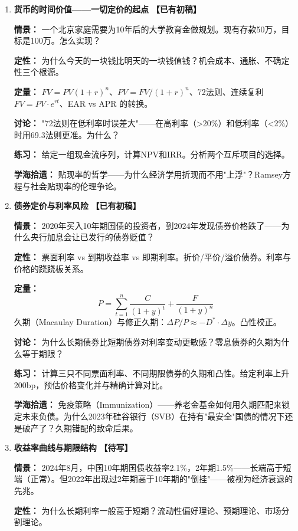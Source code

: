 \documentclass[a4paper,11pt]{ctexart}
\newcommand{\done}{\textcolor{green!50!black}{\textbf{【已有初稿】}}}
\newcommand{\draft}{\textcolor{orange!80!black}{\textbf{【待写】}}}
\begin{document}
\begin{enumerate}

\item[\textbf{第1课}] \textbf{货币的时间价值——一切定价的起点} \done

\textbf{情景：} 一个北京家庭需要为10年后的大学教育金做规划。现有存款50万，目标是100万。怎么实现？

\textbf{定性：} 为什么今天的一块钱比明天的一块钱值钱？机会成本、通胀、不确定性三个根源。

\textbf{定量：} $FV = PV(1+r)^n$、$PV = FV/(1+r)^n$、72法则、连续复利 $FV = PV \cdot e^{rt}$、EAR vs APR 的转换。

\textbf{讨论：} "72法则在低利率时误差大"——在高利率（>20\%）和低利率（<2\%）时用69.3法则更准。为什么？

\textbf{练习：} 给定一组现金流序列，计算NPV和IRR。分析两个互斥项目的选择。

\textbf{学海拾遗：} 贴现率的哲学——为什么经济学用折现而不用"上浮"？Ramsey方程与社会贴现率的伦理争论。

\item[\textbf{第2课}] \textbf{债券定价与利率风险} \done

\textbf{情景：} 2020年买入10年期国债的投资者，到2024年发现债券价格跌了——为什么央行加息会让已发行的债券贬值？

\textbf{定性：} 票面利率 vs 到期收益率 vs 即期利率。折价/平价/溢价债券。利率与价格的跷跷板关系。

\textbf{定量：} 
\[
P = \sum_{t=1}^{n} \frac{C}{(1+y)^t} + \frac{F}{(1+y)^n}
\]
久期（Macaulay Duration）与修正久期：$\Delta P/P \approx -D^* \cdot \Delta y$。凸性校正。

\textbf{讨论：} 为什么长期债券比短期债券对利率变动更敏感？零息债券的久期为什么等于期限？

\textbf{练习：} 计算三只不同票面利率、不同期限债券的久期和凸性。给定利率上升200bp，预估价格变化并与精确计算对比。

\textbf{学海拾遗：} 免疫策略（Immunization）——养老金基金如何用久期匹配来锁定未来负债。为什么2023年硅谷银行（SVB）在持有"最安全"国债的情况下还是破产了？久期错配的致命后果。

\item[\textbf{第3课}] \textbf{收益率曲线与期限结构} \draft

\textbf{情景：} 2024年8月，中国10年期国债收益率2.1\%，2年期1.5\%——长端高于短端（正常）。但2022年出现过2年期高于10年期的"倒挂"——被视为经济衰退的先兆。

\textbf{定性：} 为什么长期利率一般高于短期？流动性偏好理论、预期理论、市场分割理论。


\end{enumerate}
\end{document}
